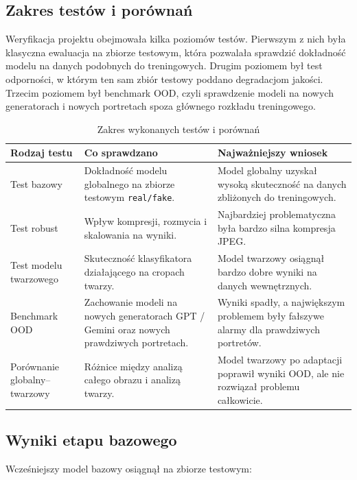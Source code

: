 \subsection{Zakres testów i porównań}

Weryfikacja projektu obejmowała kilka poziomów testów. Pierwszym z nich była klasyczna ewaluacja na zbiorze testowym, która pozwalała sprawdzić dokładność modelu na danych podobnych do treningowych. Drugim poziomem był test odporności, w którym ten sam zbiór testowy poddano degradacjom jakości. Trzecim poziomem był benchmark OOD, czyli sprawdzenie modeli na nowych generatorach i nowych portretach spoza głównego rozkładu treningowego.

\begin{table}[H]
\centering
\caption{Zakres wykonanych testów i porównań}
\label{tab:zakres-testow}
\begin{tabular}{|L{3.5cm}|L{5.1cm}|L{5.0cm}|}
\hline
\textbf{Rodzaj testu} & \textbf{Co sprawdzano} & \textbf{Najważniejszy wniosek} \\
\hline
Test bazowy & Dokładność modelu globalnego na zbiorze testowym \texttt{real/fake}. & Model globalny uzyskał wysoką skuteczność na danych zbliżonych do treningowych. \\
\hline
Test robust & Wpływ kompresji, rozmycia i skalowania na wyniki. & Najbardziej problematyczna była bardzo silna kompresja JPEG. \\
\hline
Test modelu twarzowego & Skuteczność klasyfikatora działającego na cropach twarzy. & Model twarzowy osiągnął bardzo dobre wyniki na danych wewnętrznych. \\
\hline
Benchmark OOD & Zachowanie modeli na nowych generatorach GPT / Gemini oraz nowych prawdziwych portretach. & Wyniki spadły, a największym problemem były fałszywe alarmy dla prawdziwych portretów. \\
\hline
Porównanie globalny--twarzowy & Różnice między analizą całego obrazu i analizą twarzy. & Model twarzowy po adaptacji poprawił wyniki OOD, ale nie rozwiązał problemu całkowicie. \\
\hline
\end{tabular}
\end{table}

\subsection{Wyniki etapu bazowego}

Wcześniejszy model bazowy osiągnął na zbiorze testowym:

